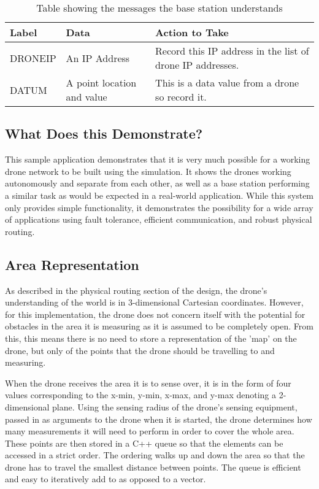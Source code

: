 \begin{table}[]
\centering
\begin{tabular}{|p{2cm}|p{4cm}|p{7.5cm}|}
\hline
Label	& Data							& Action to Take	\\ \hline
DRONEIP	& An IP Address					& Record this IP address in the list of drone IP addresses. \\ \hline
DATUM	& A point location and value	& This is a data value from a drone so record it. \\ \hline
\end{tabular}
\caption{Table showing the messages the base station understands}
\label{tbl:messages_basestation}
\end{table}

\subsection{What Does this Demonstrate?}
This sample application demonstrates that it is very much possible for a working drone network to be built using the simulation. It shows the drones working autonomously and separate from each other, as well as a base station performing a similar task as would be expected in a real-world application. While this system only provides simple functionality, it demonstrates the possibility for a wide array of applications using fault tolerance, efficient communication, and robust physical routing.

\subsection{Area Representation}

As described in the physical routing section of the design, the drone's understanding of the world is in 3-dimensional Cartesian coordinates. However, for this implementation, the drone does not concern itself with the potential for obstacles in the area it is measuring as it is assumed to be completely open. From this, this means there is no need to store a representation of the 'map' on the drone, but only of the points that the drone should be travelling to and measuring.

When the drone receives the area it is to sense over, it is in the form of four values corresponding to the x-min, y-min, x-max, and y-max denoting a 2-dimensional plane. Using the sensing radius of the drone's sensing equipment, passed in as arguments to the drone when it is started, the drone determines how many measurements it will need to perform in order to cover the whole area. These points are then stored in a C++ queue so that the elements can be accessed in a strict order. The ordering walks up and down the area so that the drone has to travel the smallest distance between points. The queue is efficient and easy to iteratively add to as opposed to a vector.

